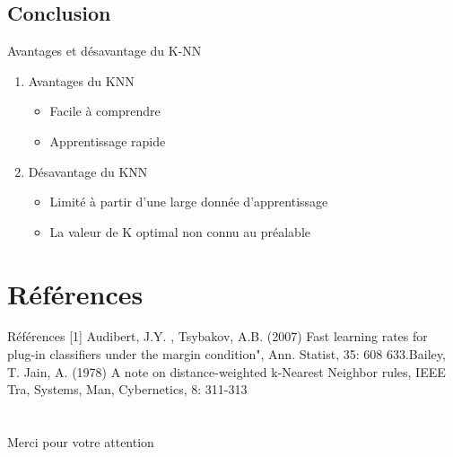 \documentclass{beamer}
\begin{document}
\subsection{Conclusion}
\begin{frame}{Avantages et désavantage du K-NN}
\begin{enumerate}
		\item Avantages du KNN\\
		\begin{itemize}
		\item Facile à comprendre
		\item Apprentissage rapide
		\end{itemize}
		\item Désavantage du KNN\\
		\begin{itemize}
		\item Limité à partir d'une large donnée d'apprentissage
		\item La valeur de K optimal non connu au préalable
		\end{itemize}
	\end{enumerate}
\end{frame}
\section{Références}
\begin{frame}{Références}
[1] Audibert, J.Y. , Tsybakov, A.B. (2007) Fast learning rates for plug-in classifiers under the margin condition", Ann. Statist, 35: 608 633.\newline
[2] Bailey, T. Jain, A. (1978) A note on distance-weighted k-Nearest Neighbor rules, IEEE Tra, Systems, Man, Cybernetics, 8: 311-313
\end{frame}
\section{}
\begin{frame}{}
 \begin{block}{}
  \centering
  Merci pour votre attention
  \end{block}
\end{frame}
\end{document}
